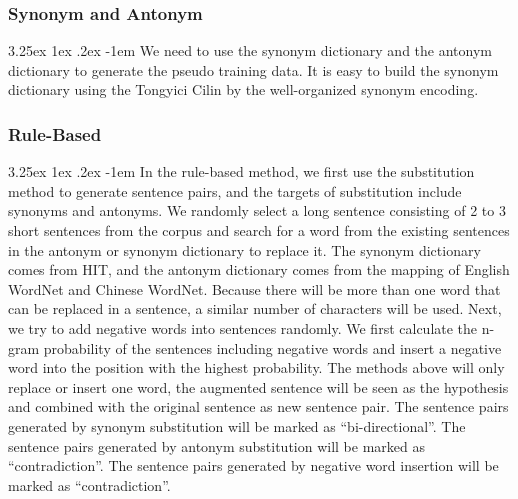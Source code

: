 \documentclass[12pt]{article}
\makeatletter
\renewcommand\paragraph{\@startsection{paragraph}{5}{\z@}%
  {3.25ex \@plus1ex \@minus.2ex}%
  {-1em}%
  {\normalfont\normalsize\bfseries}}
\makeatother
\begin{document}
\begin{CJK*}{UTF8}{bkai}
\begin{spacing}{1.77}
\subsubsection{Synonym and Antonym}
\paragraph{}
We need to use the synonym dictionary and the antonym dictionary to generate the pseudo training data. It is easy to build the synonym dictionary using the Tongyici Cilin by the well-organized synonym encoding.

\subsubsection{Rule-Based}
\paragraph{}
In the rule-based method, we first use the substitution method to generate sentence pairs, and the targets of substitution include synonyms and antonyms. We randomly select a long sentence consisting of 2 to 3 short sentences from the corpus and search for a word from the existing sentences in the antonym or synonym dictionary to replace it. The synonym dictionary comes from HIT, and the antonym dictionary comes from the mapping of English WordNet and Chinese WordNet. Because there will be more than one word that can be replaced in a sentence, a similar number of characters will be used. Next, we try to add negative words into sentences randomly. We first calculate the n-gram probability of the sentences including negative words and insert a negative word into the position with the highest probability. The methods above will only replace or insert one word, the augmented sentence will be seen as the hypothesis and combined with the original sentence as new sentence pair. The sentence pairs generated by synonym substitution will be marked as ``bi-directional''. The sentence pairs generated by antonym substitution will be marked as ``contradiction''. The sentence pairs generated by negative word insertion will be marked as ``contradiction''.


\end{spacing}
\end{CJK*}
\end{document}
